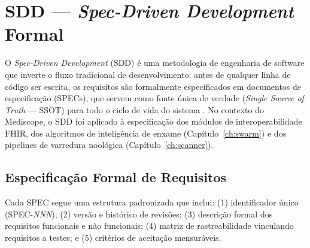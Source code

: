 
\section{SDD --- \textit{Spec-Driven Development} Formal}

O \textit{Spec-Driven Development} (SDD) é uma metodologia de engenharia de software que inverte o fluxo tradicional de desenvolvimento: antes de qualquer linha de código ser escrita, os requisitos são formalmente especificados em documentos de especificação (SPECs), que servem como fonte única de verdade (\textit{Single Source of Truth} --- SSOT) para todo o ciclo de vida do sistema \cite{beck2003tdd}. No contexto do Mediscope, o SDD foi aplicado à especificação dos módulos de interoperabilidade FHIR, dos algoritmos de inteligência de enxame (Capítulo~\ref{ch:swarm}) e dos pipelines de varredura noológica (Capítulo~\ref{ch:scanner}).

\subsection{Especificação Formal de Requisitos}

Cada SPEC segue uma estrutura padronizada que inclui: (1) identificador único (SPEC-\emph{NNN}); (2) versão e histórico de revisões; (3) descrição formal dos requisitos funcionais e não funcionais; (4) matriz de rastreabilidade vinculando requisitos a testes; e (5) critérios de aceitação mensuráveis.

